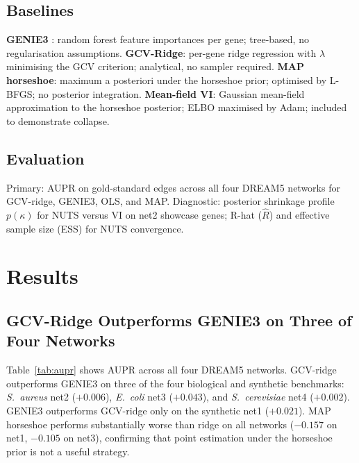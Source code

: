\documentclass[11pt]{article}
\begin{document}
\subsection{Baselines}

\textbf{GENIE3} \citep{huynh2010}: random forest feature importances per gene;
tree-based, no regularisation assumptions.
\textbf{GCV-Ridge}: per-gene ridge regression with $\lambda$ minimising the GCV
criterion; analytical, no sampler required.
\textbf{MAP horseshoe}: maximum a posteriori under the horseshoe prior; optimised by
L-BFGS; no posterior integration.
\textbf{Mean-field VI}: Gaussian mean-field approximation to the horseshoe posterior;
ELBO maximised by Adam; included to demonstrate collapse.

\subsection{Evaluation}

Primary: AUPR on gold-standard edges across all four DREAM5 networks for GCV-ridge,
GENIE3, OLS, and MAP.
Diagnostic: posterior shrinkage profile $p(\kappa)$ for NUTS versus VI on net2 showcase
genes; R-hat ($\hat R$) and effective sample size (ESS) for NUTS convergence.

\section{Results}

\subsection{GCV-Ridge Outperforms GENIE3 on Three of Four Networks}

Table~\ref{tab:aupr} shows AUPR across all four DREAM5 networks.
GCV-ridge outperforms GENIE3 on three of the four biological and synthetic benchmarks:
\textit{S.~aureus} net2 ($+0.006$), \textit{E.~coli} net3 ($+0.043$), and
\textit{S.~cerevisiae} net4 ($+0.002$). GENIE3 outperforms GCV-ridge only on the
synthetic net1 ($+0.021$). MAP horseshoe performs substantially worse than ridge on all
networks ($-0.157$ on net1, $-0.105$ on net3), confirming that point estimation under
the horseshoe prior is not a useful strategy.
\end{document}
